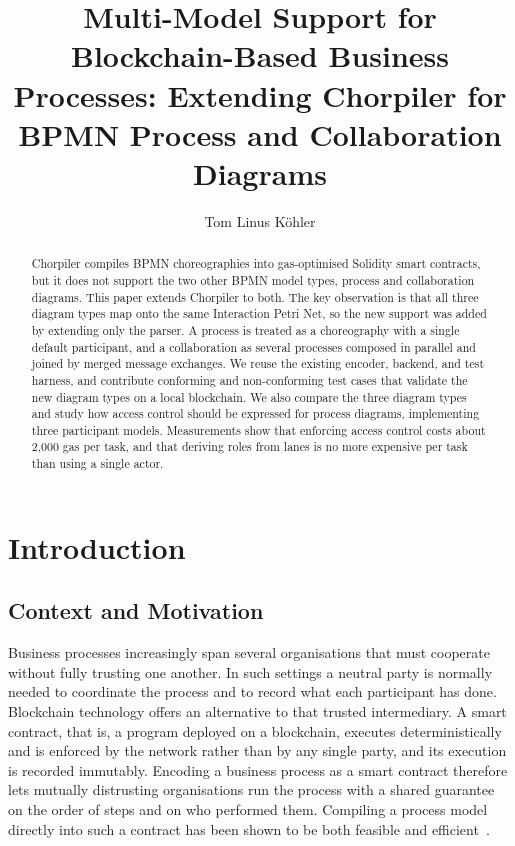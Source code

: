 \documentclass[runningheads]{llncs}
\begin{document}
\title{Multi-Model Support for Blockchain-Based Business Processes: Extending Chorpiler for BPMN Process and Collaboration Diagrams}

\author{Tom Linus Köhler}

\maketitle

\begin{abstract}
Chorpiler compiles BPMN choreographies into gas-optimised Solidity smart contracts, but it does not support the two other BPMN model types, process and collaboration diagrams. This paper extends Chorpiler to both. The key observation is that all three diagram types map onto the same Interaction Petri Net, so the new support was added by extending only the parser. A process is treated as a choreography with a single default participant, and a collaboration as several processes composed in parallel and joined by merged message exchanges. We reuse the existing encoder, backend, and test harness, and contribute conforming and non-conforming test cases that validate the new diagram types on a local blockchain. We also compare the three diagram types and study how access control should be expressed for process diagrams, implementing three participant models. Measurements show that enforcing access control costs about 2{,}000 gas per task, and that deriving roles from lanes is no more expensive per task than using a single actor.
\end{abstract}

\section{Introduction}

\subsection{Context and Motivation}
Business processes increasingly span several organisations that must cooperate without fully trusting one another. In such settings a neutral party is normally needed to coordinate the process and to record what each participant has done. Blockchain technology offers an alternative to that trusted intermediary. A smart contract, that is, a program deployed on a blockchain, executes deterministically and is enforced by the network rather than by any single party, and its execution is recorded immutably. Encoding a business process as a smart contract therefore lets mutually distrusting organisations run the process with a shared guarantee on the order of steps and on who performed them. Compiling a process model directly into such a contract has been shown to be both feasible and efficient~\cite{garcia,weber}. 
\end{document}

